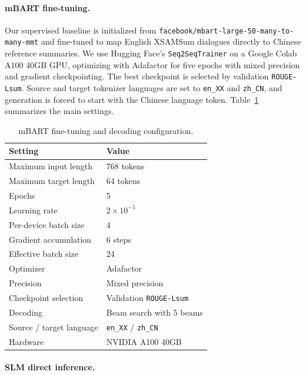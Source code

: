 \documentclass[11pt]{article}
\begin{document}
\paragraph{mBART fine-tuning.}

Our supervised baseline is initialized from \texttt{facebook/mbart-large-50-many-to-many-mmt} \citep{liu-etal-2020-multilingual-denoising,tang-etal-2021-multilingual} and fine-tuned to map English XSAMSum dialogues directly to Chinese reference summaries. We use Hugging Face's \texttt{Seq2SeqTrainer} on a Google Colab A100 40GB GPU, optimizing with Adafactor for five epochs with mixed precision and gradient checkpointing. The best checkpoint is selected by validation \texttt{ROUGE-Lsum}. Source and target tokenizer languages are set to \texttt{en\_XX} and \texttt{zh\_CN}, and generation is forced to start with the Chinese language token. Table~\ref{tab:mbart-training} summarizes the main settings.

\begin{table}[H]
\centering
\footnotesize
\setlength{\tabcolsep}{4pt}
\begin{tabularx}{\columnwidth}{@{}lX@{}}
\hline
Setting & Value \\
\hline
Maximum input length & 768 tokens \\
Maximum target length & 64 tokens \\
Epochs & 5 \\
Learning rate & $2\times10^{-5}$ \\
Per-device batch size & 4 \\
Gradient accumulation & 6 steps \\
Effective batch size & 24 \\
Optimizer & Adafactor \\
Precision & Mixed precision \\
Checkpoint selection & Validation \texttt{ROUGE-Lsum} \\
Decoding & Beam search with 5 beams \\
Source / target language & \texttt{en\_XX} / \texttt{zh\_CN} \\
Hardware & NVIDIA A100 40GB \\
\hline
\end{tabularx}
\caption{mBART fine-tuning and decoding configuration.}
\label{tab:mbart-training}
\end{table}

\paragraph{SLM direct inference.}
\end{document}
